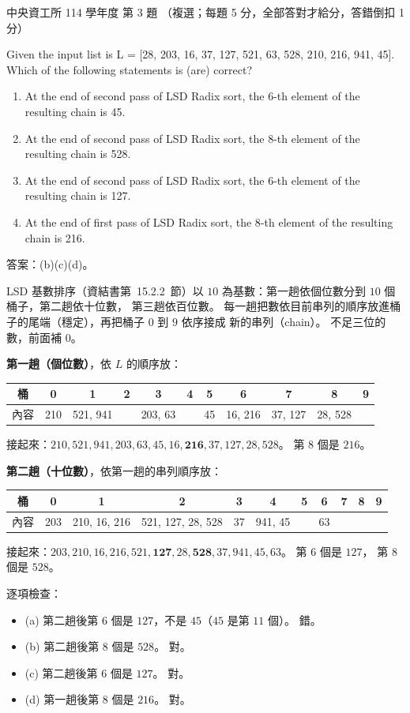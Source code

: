 \begin{pastexam}[label={px:ncu-114-dsa-03}]{中央資工所 114 學年度 第 3 題}
（複選；每題 5 分，全部答對才給分，答錯倒扣 1 分）

Given the input list is L = [28, 203, 16, 37, 127, 521, 63, 528, 210, 216, 941, 45]. Which of the
following statements is (are) correct?
\begin{enumerate}[label=(\alph*)]
\item At the end of second pass of LSD Radix sort, the 6-th element of the resulting chain is 45.
\item At the end of second pass of LSD Radix sort, the 8-th element of the resulting chain is 528.
\item At the end of second pass of LSD Radix sort, the 6-th element of the resulting chain is 127.
\item At the end of first pass of LSD Radix sort, the 8-th element of the resulting chain is 216.
\end{enumerate}
\end{pastexam}

\begin{pastsoln}
答案：(b)(c)(d)。

LSD 基數排序（資結書第~15.2.2~節）以 $10$ 為基數：第一趟依個位數分到 $10$ 個桶子，第二趟依十位數，
第三趟依百位數。 每一趟把數依目前串列的順序放進桶子的尾端（穩定），再把桶子 $0$ 到 $9$ 依序接成
新的串列（chain）。 不足三位的數，前面補 $0$。

\textbf{第一趟（個位數）}，依 $L$ 的順序放：
\begin{center}
\small
\begin{tabular}{c*{10}{c}}
\toprule
桶 & 0 & 1 & 2 & 3 & 4 & 5 & 6 & 7 & 8 & 9 \\
\midrule
內容 & 210 & 521, 941 & & 203, 63 & & 45 & 16, 216 & 37, 127 & 28, 528 & \\
\bottomrule
\end{tabular}
\end{center}
接起來：$210, 521, 941, 203, 63, 45, 16, \mathbf{216}, 37, 127, 28, 528$。 第 $8$ 個是 $216$。

\textbf{第二趟（十位數）}，依第一趟的串列順序放：
\begin{center}
\small
\begin{tabular}{c*{10}{c}}
\toprule
桶 & 0 & 1 & 2 & 3 & 4 & 5 & 6 & 7 & 8 & 9 \\
\midrule
內容 & 203 & 210, 16, 216 & 521, 127, 28, 528 & 37 & 941, 45 & & 63 & & & \\
\bottomrule
\end{tabular}
\end{center}
接起來：$203, 210, 16, 216, 521, \mathbf{127}, 28, \mathbf{528}, 37, 941, 45, 63$。 第 $6$ 個是 $127$，
第 $8$ 個是 $528$。

逐項檢查：
\begin{itemize}
\item (a) 第二趟後第 $6$ 個是 $127$，不是 $45$（$45$ 是第 $11$ 個）。 錯。
\item (b) 第二趟後第 $8$ 個是 $528$。 對。
\item (c) 第二趟後第 $6$ 個是 $127$。 對。
\item (d) 第一趟後第 $8$ 個是 $216$。 對。
\end{itemize}
\end{pastsoln}
